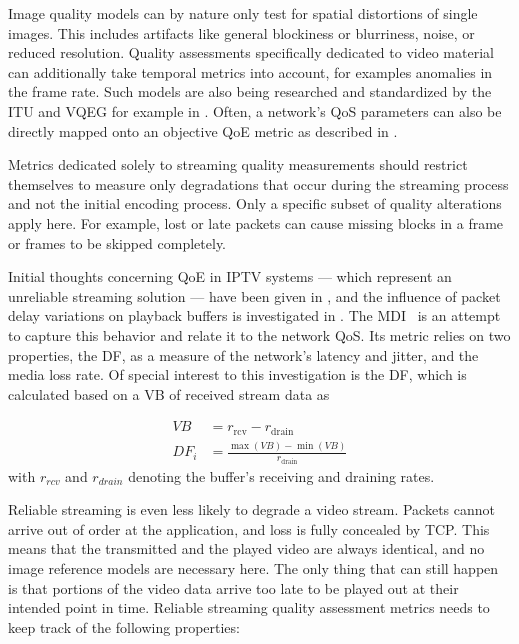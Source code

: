 Image quality models can by nature only test for spatial distortions of single images. This includes artifacts like general blockiness or blurriness, noise, or reduced resolution. Quality assessments specifically dedicated to video material can additionally take temporal metrics into account, for examples anomalies in the frame rate. Such models are also being researched and standardized by the \gls{ITU} and \gls{VQEG} for example in \cite{ituJ144, ituJ246, ituJ247}. Often, a network's \gls{QoS} parameters can also be directly mapped onto an objective \gls{QoE} metric as described in \cite{5430142}.

Metrics dedicated solely to streaming quality measurements should restrict themselves to measure only degradations that occur during the streaming process and not the initial encoding process. Only a specific subset of quality alterations apply here. For example, lost or late packets can cause missing blocks in a frame or frames to be skipped completely. 

Initial thoughts concerning \gls{QoE} in \gls{IPTV} systems --- which represent an unreliable streaming solution --- have been given in \cite{ituG1080}, and the influence of packet delay variations on playback buffers is investigated in \cite{rfc3393}. The \gls{MDI}~\cite{rfc4445} is an attempt to capture this behavior and relate it to the network \gls{QoS}. Its metric relies on two properties, the \gls{DF}, as a measure of the network's latency and jitter, and the media loss rate. Of special interest to this investigation is the \gls{DF}, which is calculated based on a \gls{VB} of received stream data as


\begin{align}
	VB &= r_{\text{rcv}} - r_{\text{drain}} \\
	DF_i &= \frac{\max(VB) - \min(VB)}{r_{\text{drain}}}
\end{align}
%
with $r_{rcv}$ and $r_{drain}$ denoting the buffer's receiving and draining rates.

Reliable streaming is even less likely to degrade a video stream. Packets cannot arrive out of order at the application, and loss is fully concealed by \gls{TCP}. This means that the transmitted and the played video are always identical, and no image reference models are necessary here. The only thing that can still happen is that portions of the video data arrive too late to be played out at their intended point in time. Reliable streaming quality assessment metrics needs to keep track of the following properties:

